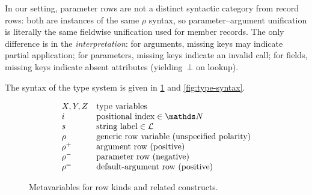 \noindent
In our setting, parameter rows are not a distinct syntactic category from record rows: both are instances of the same $\rho$ syntax, so parameter–argument unification is literally the same fieldwise unification used for member records.  
The only difference is in the \emph{interpretation}:
for arguments, missing keys may indicate partial application;
for parameters, missing keys indicate an invalid call;
for fields, missing keys indicate absent attributes (yielding~$\bot$ on lookup).

The syntax of the type system is given in \cref{fig:metavars} and \cref{fig:type-syntax}.

\begin{figure}[t]
\centering
\[
\begin{array}{ll}
X, Y, Z & \text{type variables} \\
i & \text{positional index} \in \tN \\
s & \text{string label} \in \mathcal{L} \\
\rho & \text{generic row variable (unspecified polarity)} \\
\rpos & \text{argument row (positive)} \\
\rneg & \text{parameter row (negative)} \\
\rdef & \text{default-argument row (positive)}
\end{array}
\]
\caption{Metavariables for row kinds and related constructs.}
\label{fig:metavars}
\end{figure}

